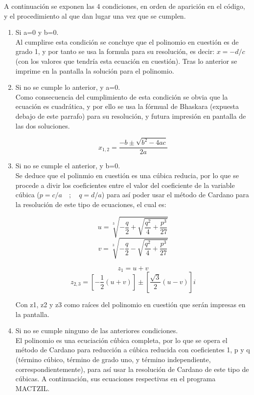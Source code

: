 \documentclass[12pt,letterpaper]{article}
\begin{document}
\noindent A continuación se exponen las 4 condiciones, en orden de aparición en el código, y el procedimiento al que dan lugar una vez que se cumplen.

\begin{enumerate}
    \item Si a=0 y b=0.\\
    
    Al cumplirse esta condición se concluye que el polinomio en cuestión es de grado 1, y por tanto se usa la formula para su resolución, es decir: $x=-d/c$ (con los valores que tendría esta ecuación en cuestión). Tras lo anterior se imprime en la pantalla la solución para el polinomio.
    
    \item Si no se cumple lo anterior, y a=0.\\
    
    Como consecuencia del cumplimiento de esta condición se obvia que la ecuación es cuadrática, y por ello se usa la fórmual de Bhaskara (expuesta debajo de este parrafo) para su resolución, y futura impresión en pantalla de las dos soluciones.
    
    $$x_{1,2} = \frac{-b\pm \sqrt{b^{2} -4ac}}{2a}$$
    
    \item Si no se cumple el anterior, y b=0.\\

    Se deduce que el polinmio en cuestión es una cúbica reducia, por lo que se procede a divir los coeficientes entre el valor del coeficiente de la variable cúbica ($p=c/a\quad ;\quad q=d/a$) para así poder usar el método de Cardano para la resolución de este tipo de ecuaciones, el cual es:
    
    $$u = \sqrt[3]{-\frac{q}{2} +\sqrt{\frac{q^2}{4} + \frac{p^3}{27} } } $$
    $$v = \sqrt[3]{-\frac{q}{2} -\sqrt{\frac{q^2}{4} + \frac{p^3}{27} } } $$

    $$ z_1 = u+v $$
    $$ z_{2,3} = \left[ -\frac{1}{2}(u+v) \right] \pm \left[\frac{\sqrt{3}}{2}(u-v) \right]i$$

    Con z1, z2 y z3 como raíces del polinomio en cuestión que serán impresas en la pantalla.
    
    \item Si no se cumple ninguno de las anteriores condiciones.\\

    El polinomio es una ecuciación cúbica completa, por lo que se opera el método de Cardano para reducción a cúbica reducida con coeficientes 1, p y q (término cúbico, término de grado uno, y término independiente, correspondientemente), para así usar la resolución de Cardano de este tipo de cúbicas. A continuación, sus ecuaciones respectivas en el programa MACTZIL. 


\end{enumerate}
\end{document}
